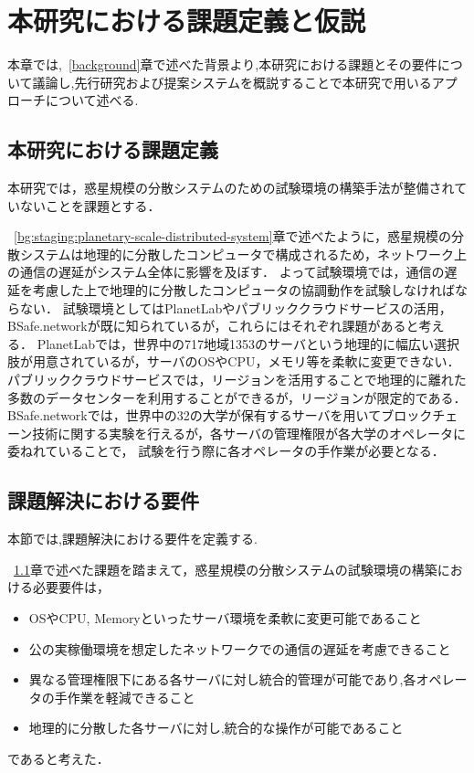 \chapter{本研究における課題定義と仮説}
\label{issue}

本章では,~\ref{background}章で述べた背景より,本研究における課題とその要件について議論し,先行研究および提案システムを概説することで本研究で用いるアプローチについて述べる.

\section{本研究における課題定義}
\label{issue:definition}

本研究では，惑星規模の分散システムのための試験環境の構築手法が整備されていないことを課題とする．

~\ref{bg:staging:planetary-scale-distributed-system}章で述べたように，惑星規模の分散システムは地理的に分散したコンピュータで構成されるため，ネットワーク上の通信の遅延がシステム全体に影響を及ぼす．
よって試験環境では，通信の遅延を考慮した上で地理的に分散したコンピュータの協調動作を試験しなければならない．
試験環境としてはPlanetLabやパブリッククラウドサービスの活用，BSafe.networkが既に知られているが，これらにはそれぞれ課題があると考える．
PlanetLabでは，世界中の717地域1353のサーバという地理的に幅広い選択肢が用意されているが，サーバのOSやCPU，メモリ等を柔軟に変更できない．
パブリッククラウドサービスでは，リージョンを活用することで地理的に離れた多数のデータセンターを利用することができるが，リージョンが限定的である．
BSafe.networkでは，世界中の32の大学が保有するサーバを用いてブロックチェーン技術に関する実験を行えるが，各サーバの管理権限が各大学のオペレータに委ねれていることで，
試験を行う際に各オペレータの手作業が必要となる．

\section{課題解決における要件}
\label{issue:requirements}

本節では,課題解決における要件を定義する.

~\ref{issue:definition}章で述べた課題を踏まえて，惑星規模の分散システムの試験環境の構築における必要要件は，
\begin{itemize}
  \item OSやCPU, Memoryといったサーバ環境を柔軟に変更可能であること
  \item 公の実稼働環境を想定したネットワークでの通信の遅延を考慮できること
  \item 異なる管理権限下にある各サーバに対し統合的管理が可能であり,各オペレータの手作業を軽減できること
  \item 地理的に分散した各サーバに対し,統合的な操作が可能であること
\end{itemize}
であると考えた．

